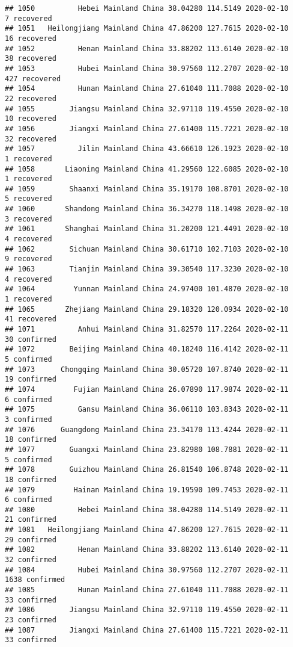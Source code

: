 \documentclass[
]{article}
\begin{document}
\begin{verbatim}
## 1050          Hebei Mainland China 38.04280 114.5149 2020-02-10     7 recovered
## 1051   Heilongjiang Mainland China 47.86200 127.7615 2020-02-10    16 recovered
## 1052          Henan Mainland China 33.88202 113.6140 2020-02-10    38 recovered
## 1053          Hubei Mainland China 30.97560 112.2707 2020-02-10   427 recovered
## 1054          Hunan Mainland China 27.61040 111.7088 2020-02-10    22 recovered
## 1055        Jiangsu Mainland China 32.97110 119.4550 2020-02-10    10 recovered
## 1056        Jiangxi Mainland China 27.61400 115.7221 2020-02-10    32 recovered
## 1057          Jilin Mainland China 43.66610 126.1923 2020-02-10     1 recovered
## 1058       Liaoning Mainland China 41.29560 122.6085 2020-02-10     1 recovered
## 1059        Shaanxi Mainland China 35.19170 108.8701 2020-02-10     5 recovered
## 1060       Shandong Mainland China 36.34270 118.1498 2020-02-10     3 recovered
## 1061       Shanghai Mainland China 31.20200 121.4491 2020-02-10     4 recovered
## 1062        Sichuan Mainland China 30.61710 102.7103 2020-02-10     9 recovered
## 1063        Tianjin Mainland China 39.30540 117.3230 2020-02-10     4 recovered
## 1064         Yunnan Mainland China 24.97400 101.4870 2020-02-10     1 recovered
## 1065       Zhejiang Mainland China 29.18320 120.0934 2020-02-10    41 recovered
## 1071          Anhui Mainland China 31.82570 117.2264 2020-02-11    30 confirmed
## 1072        Beijing Mainland China 40.18240 116.4142 2020-02-11     5 confirmed
## 1073      Chongqing Mainland China 30.05720 107.8740 2020-02-11    19 confirmed
## 1074         Fujian Mainland China 26.07890 117.9874 2020-02-11     6 confirmed
## 1075          Gansu Mainland China 36.06110 103.8343 2020-02-11     3 confirmed
## 1076      Guangdong Mainland China 23.34170 113.4244 2020-02-11    18 confirmed
## 1077        Guangxi Mainland China 23.82980 108.7881 2020-02-11     5 confirmed
## 1078        Guizhou Mainland China 26.81540 106.8748 2020-02-11    18 confirmed
## 1079         Hainan Mainland China 19.19590 109.7453 2020-02-11     6 confirmed
## 1080          Hebei Mainland China 38.04280 114.5149 2020-02-11    21 confirmed
## 1081   Heilongjiang Mainland China 47.86200 127.7615 2020-02-11    29 confirmed
## 1082          Henan Mainland China 33.88202 113.6140 2020-02-11    32 confirmed
## 1084          Hubei Mainland China 30.97560 112.2707 2020-02-11  1638 confirmed
## 1085          Hunan Mainland China 27.61040 111.7088 2020-02-11    33 confirmed
## 1086        Jiangsu Mainland China 32.97110 119.4550 2020-02-11    23 confirmed
## 1087        Jiangxi Mainland China 27.61400 115.7221 2020-02-11    33 confirmed

\end{verbatim}
\end{document}
